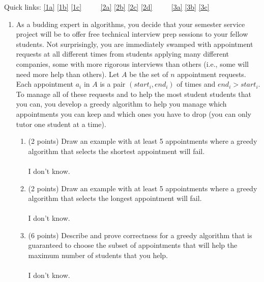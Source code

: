 \documentclass[12pt]{article}
\begin{document}
\renewcommand{\headrulewidth}{0.5pt}
\phantom{Test}

Quick links: \ref{1a} \ref{1b} \ref{1c} $\qquad$ \ref{2a} \ref{2b} \ref{2c} \ref{2d} $\qquad$ \ref{3a} \ref{3b} \ref{3c} 

\vspace{-3mm}
\begin{enumerate}

\item %
As a budding expert in algorithms, you decide that your semester service
project will be to offer free technical interview prep sessions to your fellow
students. Not surprisingly, you are immediately swamped with appointment
requests at all different times from students applying many
different companies, some with more rigorous interviews than others
(i.e., some will need more help than others). Let $A$ be the set of $n$
appointment requests. Each appointment $a_i$ in $A$ is a pair 
$(start_i, end_i)$ of times and $end_i>start_i$. To manage all of these
requests and to help the most student students that you can, you
develop a greedy algorithm to help you manage which appointments you can keep
and which ones you have to drop (you can only tutor one student at a
time).  

\pagebreak
\begin{enumerate}
    \item \label{1a} (2 points) Draw an example with at least 5 appointments where a greedy algorithm
    that selects the shortest appointment will fail.
\\ \\ I don't know.
\pagebreak
\item \label{1b} (2 points) Draw an example with at least 5 appointments where a greedy algorithm
    that selects the longest appointment will fail.
\\ \\ I don't know.
\pagebreak
\item \label{1c} (6 points) Describe and prove correctness for a greedy algorithm that is guaranteed
    to choose the subset of appointments that will help the maximum number of
    students that you help.
\\ \\ I don't know.
\pagebreak
\end{enumerate}


\end{enumerate}
\end{document}
